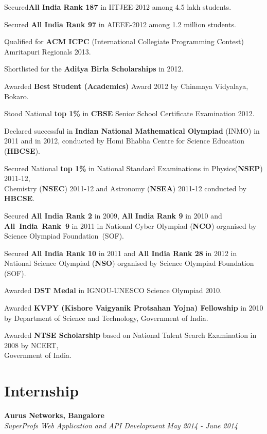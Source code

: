 \documentclass[margin,10pt]{resume}
\begin{document}
\begin{resume}
\begin{list2}
\begin{spacing}{1.4}
\item Secured\textbf{All India Rank 187} in IITJEE-2012 among 4.5 lakh students.
\item Secured \textbf{All India Rank 97} in AIEEE-2012 among 1.2 million students.
\item Qualified for \textbf{ACM ICPC} (International Collegiate Programming Contest) \mbox{Amritapuri} Regionals 2013.
\item Shortlisted for the \textbf{Aditya Birla Scholarships} in 2012.
\item Awarded \textbf{Best Student (Academics)} Award 2012 by Chinmaya Vidyalaya, Bokaro.
\item Stood National \textbf{top 1\%} in \textbf{CBSE} Senior School Certificate Examination 2012.
\item Declared successful in \textbf{Indian National Mathematical Olympiad} (INMO) in 2011 and in 2012, conducted by Homi Bhabha Centre for Science Education (\textbf{HBCSE}).
\item Secured National \textbf{top 1\%} in National Standard Examinations in
Physics(\textbf {NSEP}) \mbox{2011-12,} \\Chemistry (\textbf {NSEC}) 2011-12 and Astronomy (\textbf{NSEA}) 2011-12 conducted by \textbf{HBCSE}.	
\item Secured \textbf{All India Rank 2} in 2009, \textbf{All India Rank 9} in 2010 and \mbox{\textbf{All India Rank 9}} in 2011 in National Cyber Olympiad (\textbf{NCO}) organised by Science Olympiad \mbox{Foundation (SOF).}
\item Secured \textbf{All India Rank 10} in 2011 and \textbf{All India Rank 28} in 2012 in National Science Olympiad (\textbf{NSO}) organised by Science Olympiad Foundation (SOF).
\item Awarded \textbf{DST Medal} in IGNOU-UNESCO Science Olympiad 2010.
\item Awarded \textbf{KVPY (Kishore Vaigyanik Protsahan Yojna) Fellowship} in 2010
by Department of Science and Technology, Government of India.
\item Awarded \textbf{NTSE Scholarship} based on National Talent Search Examination in 2008 by NCERT,\\ Government of India.
\end{spacing}
\end{list2}
\vspace{-5mm}
\section{\mysidestyle Internship}
\begin{list2}
\item \textbf{Aurus Networks, Bangalore}\\
\textsl{SuperProfs Web Application and API Development} \hfill \emph{May 2014 - June 2014}


\end{list2}
\end{resume}
\end{document}
